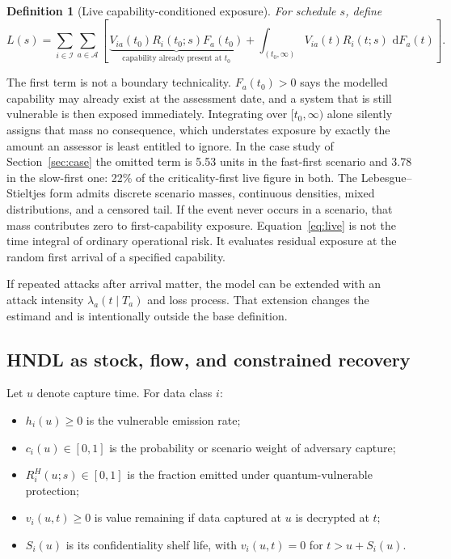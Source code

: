 \documentclass[10pt]{article}
\newtheorem{definition}{Definition}
\newcommand{\dd}{\,\mathrm{d}}
\begin{document}
\begin{definition}[Live capability-conditioned exposure]
For schedule $s$, define
\begin{equation}
L(s)=\sum_{i\in\mathcal I}\sum_{a\in\mathcal A}
\left[\,\underbrace{V_{ia}(t_0)R_i(t_0;s)F_a(t_0)}_{\text{capability already present at }t_0}
+\int_{(t_0,\infty)} V_{ia}(t)R_i(t;s)\,\dd F_a(t)\right].
\label{eq:live}
\end{equation}
\end{definition}

The first term is not a boundary technicality. $F_a(t_0)>0$ says the modelled capability may
already exist at the assessment date, and a system that is still vulnerable is then exposed
immediately. Integrating over $[t_0,\infty)$ alone silently assigns that mass no consequence,
which understates exposure by exactly the amount an assessor is least entitled to ignore. In the
case study of Section~\ref{sec:case} the omitted term is 5.53 units in the fast-first scenario and
3.78 in the slow-first one: 22\% of the criticality-first live figure in both.
The Lebesgue--Stieltjes form admits discrete scenario masses, continuous densities, mixed distributions, and a censored tail. If the event never occurs in a scenario, that mass contributes zero to first-capability exposure. Equation~\eqref{eq:live} is not the time integral of ordinary operational risk. It evaluates residual exposure at the random first arrival of a specified capability.

If repeated attacks after arrival matter, the model can be extended with an attack intensity $\lambda_a(t\mid T_a)$ and loss process. That extension changes the estimand and is intentionally outside the base definition.

\subsection{HNDL as stock, flow, and constrained recovery}

Let $u$ denote capture time. For data class $i$:

\begin{itemize}
\item $h_i(u)\ge0$ is the vulnerable emission rate;
\item $c_i(u)\in[0,1]$ is the probability or scenario weight of adversary capture;
\item $R_i^H(u;s)\in[0,1]$ is the fraction emitted under quantum-vulnerable protection;
\item $v_i(u,t)\ge0$ is value remaining if data captured at $u$ is decrypted at $t$;
\item $S_i(u)$ is its confidentiality shelf life, with $v_i(u,t)=0$ for $t>u+S_i(u)$.
\end{itemize}
\end{document}
